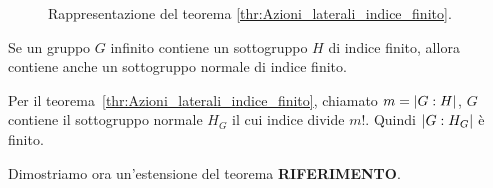 \begin{figure}[tp]
	\centering
	\caption{Rappresentazione del teorema \ref{thr:Azioni_laterali_indice_finito}.}
	\label{fig:Azioni_laterali_indice_finito}
\end{figure}

\begin{teorema}
	Se un gruppo $G$ infinito contiene un sottogruppo $H$ di indice finito, allora contiene anche un sottogruppo normale di indice finito.
\end{teorema}
\begin{dimostrazione}
	Per il teorema~\ref{thr:Azioni_laterali_indice_finito}, chiamato $m = \lvert G:H \rvert$, $G$ contiene il sottogruppo normale $H_G$ il cui indice divide $m!$. Quindi $\lvert G:H_G \rvert$ è finito.
\end{dimostrazione}

Dimostriamo ora un'estensione del teorema \textbf{RIFERIMENTO}.


